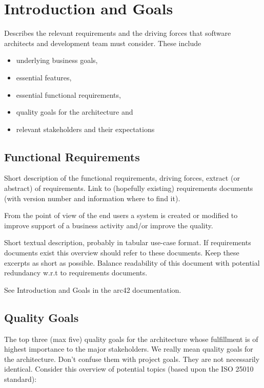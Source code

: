 \section{Introduction and Goals}

Describes the relevant requirements and the driving forces that software architects and development team must consider. These include
\begin{itemize}
  \item underlying business goals,
  \item essential features,
  \item essential functional requirements,
  \item quality goals for the architecture and
  \item relevant stakeholders and their expectations
\end{itemize}

\subsection{Functional Requirements}

Short description of the functional requirements, driving forces, extract (or abstract) of requirements. Link to (hopefully existing) requirements documents (with version number and information where to find it).

From the point of view of the end users a system is created or modified to improve support of a business activity and/or improve the quality.

Short textual description, probably in tabular use-case format. If requirements documents exist this overview should refer to these documents.
Keep these excerpts as short as possible. Balance readability of this document with potential redundancy w.r.t to requirements documents.

See Introduction and Goals in the arc42 documentation.

\subsection{Quality Goals}

The top three (max five) quality goals for the architecture whose fulfillment is of highest importance to the major stakeholders. We really mean quality goals for the architecture. Don’t confuse them with project goals. They are not necessarily identical.
Consider this overview of potential topics (based upon the ISO 25010 standard):

